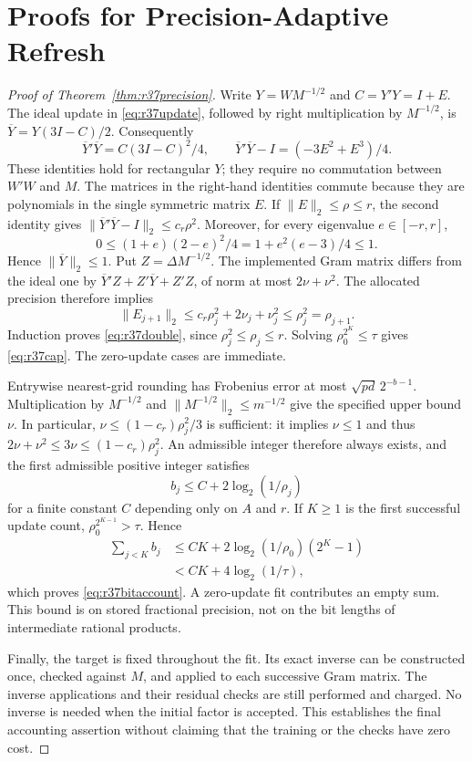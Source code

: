 \section{Proofs for Precision-Adaptive Refresh}\label{sec:r37proof}
\begin{proof}[Proof of Theorem~\ref{thm:r37precision}]
Write $Y=WM^{-1/2}$ and $C=Y'Y=I+E$. The ideal update in
\eqref{eq:r37update}, followed by right multiplication by $M^{-1/2}$,
is $\overline Y=Y(3I-C)/2$. Consequently
\[
 \overline Y'\overline Y=C(3I-C)^2/4,
 \qquad \overline Y'\overline Y-I=(-3E^2+E^3)/4.
\]
These identities hold for rectangular $Y$; they require no commutation
between $W'W$ and $M$. The matrices in the right-hand identities commute
because they are polynomials in the single symmetric matrix $E$.
If $\|E\|_2\leq\rho\leq r$, the second identity gives
$\|\overline Y'\overline Y-I\|_2\leq c_r\rho^2$.
Moreover, for every eigenvalue $e\in[-r,r]$,
\[
 0\leq(1+e)(2-e)^2/4=1+e^2(e-3)/4\leq1.
\]
Hence $\|\overline Y\|_2\leq1$. Put $Z=\Delta M^{-1/2}$.
The implemented Gram matrix differs from the ideal one by
$\overline Y'Z+Z'\overline Y+Z'Z$, of norm at most $2\nu+\nu^2$.
The allocated precision therefore implies
\[
 \|E_{j+1}\|_2\leq c_r\rho_j^2+2\nu_j+\nu_j^2
                         \leq\rho_j^2=\rho_{j+1}.
\]
Induction proves \eqref{eq:r37double}, since $\rho_j^2\leq\rho_j\leq r$.
Solving $\rho_0^{2^K}\leq\tau$ gives \eqref{eq:r37cap}. The zero-update
cases are immediate.

Entrywise nearest-grid rounding has Frobenius error at most
$\sqrt{pd}\,2^{-b-1}$. Multiplication by $M^{-1/2}$ and
$\|M^{-1/2}\|_2\leq m^{-1/2}$ give the specified upper bound $\nu$.
In particular, $\nu\leq(1-c_r)\rho_j^2/3$ is sufficient: it implies
$\nu\leq1$ and thus $2\nu+\nu^2\leq3\nu\leq(1-c_r)\rho_j^2$.
An admissible integer therefore always exists, and the first admissible
positive integer satisfies
\[
 b_j\leq C+2\log_2(1/\rho_j)
\]
for a finite constant $C$ depending only on $A$ and $r$. If $K\geq1$ is
the first successful update count, $\rho_0^{2^{K-1}}>\tau$. Hence
\begin{align*}
 \sum_{j<K} b_j
 &\leq CK+2\log_2(1/\rho_0)(2^K-1)\\
 &<CK+4\log_2(1/\tau),
\end{align*}
which proves \eqref{eq:r37bitaccount}. A zero-update fit contributes an
empty sum. This bound is on stored fractional precision, not on the bit
lengths of intermediate rational products.

Finally, the target is fixed throughout the fit. Its exact inverse can be
constructed once, checked against $M$, and applied to each successive Gram
matrix. The inverse applications and their residual checks are still
performed and charged. No inverse is needed when the initial factor is
accepted. This establishes the final accounting assertion without claiming
that the training or the checks have zero cost.
\end{proof}


